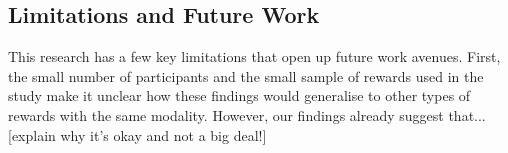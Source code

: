 \documentclass{scaffold/sigchi}
\begin{document}




\subsection{Limitations and Future Work}

This research has a few key limitations that open up future work avenues. First, the small number of participants and the small sample of rewards used in the study make it unclear how these findings would generalise to other types of rewards with the same modality. However, our findings already suggest that...  [explain why it's okay and not a big deal!]
\end{document}
